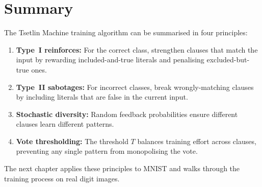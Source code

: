 \section{Summary}
\label{sec:ch6-summary}

The Tsetlin Machine training algorithm can be summarised in four
principles:

\begin{enumerate}
  \item \textbf{Type~I reinforces:} For the correct class, strengthen
    clauses that match the input by rewarding included-and-true
    literals and penalising excluded-but-true ones.
  \item \textbf{Type~II sabotages:} For incorrect classes, break
    wrongly-matching clauses by including literals that are false
    in the current input.
  \item \textbf{Stochastic diversity:} Random feedback probabilities
    ensure different clauses learn different patterns.
  \item \textbf{Vote thresholding:} The threshold $T$ balances
    training effort across clauses, preventing any single pattern
    from monopolising the vote.
\end{enumerate}

The next chapter applies these principles to MNIST and walks through
the training process on real digit images.
